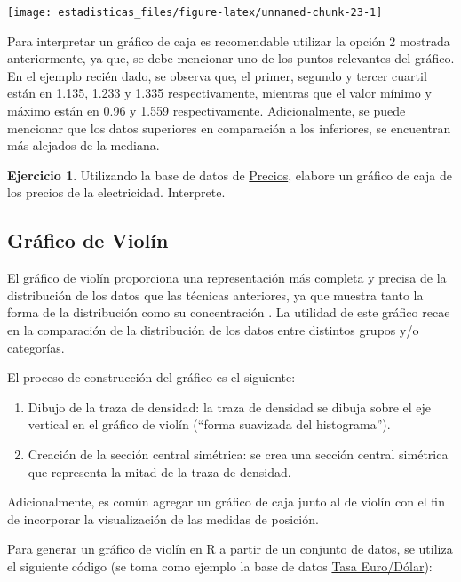 \documentclass[
  11pt,
]{book}
\providecommand{\tightlist}{%
  \setlength{\itemsep}{0pt}\setlength{\parskip}{0pt}}
\theoremstyle{definition}
\theoremstyle{definition}
\theoremstyle{definition}
\newtheorem{exercise}{Ejercicio}[chapter]
\theoremstyle{definition}
\theoremstyle{remark}
\begin{document}
\begin{center}\texttt{[image: estadisticas\_files/figure-latex/unnamed-chunk-23-1]} \end{center}

Para interpretar un gráfico de caja es recomendable utilizar la opción 2 mostrada anteriormente, ya que, se debe mencionar uno de los puntos relevantes del gráfico. En el ejemplo recién dado, se observa que, el primer, segundo y tercer cuartil están en 1.135, 1.233 y 1.335 respectivamente, mientras que el valor mínimo y máximo están en 0.96 y 1.559 respectivamente. Adicionalmente, se puede mencionar que los datos superiores en comparación a los inferiores, se encuentran más alejados de la mediana.

\begin{exercise}
Utilizando la base de datos de \hyperref[PreciosElectricidad]{Precios}, elabore un gráfico de caja de los precios de la electricidad. Interprete.
\end{exercise}

\subsection{Gráfico de Violín}\label{gruxe1fico-de-violuxedn}

El gráfico de violín proporciona una representación más completa y precisa de la distribución de los datos que las técnicas anteriores, ya que muestra tanto la forma de la distribución como su concentración \citep{hintze1998violin}. La utilidad de este gráfico recae en la comparación de la distribución de los datos entre distintos grupos y/o categorías.

El proceso de construcción del gráfico es el siguiente:

\begin{enumerate}
\def\labelenumi{\arabic{enumi}.}
\tightlist
\item
  Dibujo de la traza de densidad: la traza de densidad se dibuja sobre el eje vertical en el gráfico de violín (``forma suavizada del histograma'').
\item
  Creación de la sección central simétrica: se crea una sección central simétrica que representa la mitad de la traza de densidad.
\end{enumerate}

Adicionalmente, es común agregar un gráfico de caja junto al de violín con el fin de incorporar la visualización de las medidas de posición.

Para generar un gráfico de violín en R a partir de un conjunto de datos, se utiliza el siguiente código (se toma como ejemplo la base de datos \hyperref[TasaEURUSD]{Tasa Euro/Dólar}):
\end{document}
